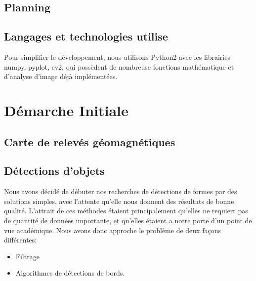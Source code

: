 \documentclass[a4paper, 12pt, titlepage, oneside, french]{article}
\begin{document}
	\subsection{Planning}
	\subsection{Langages et technologies utilise}
	Pour simplifier le développement, nous utilisons Python2 avec les librairies numpy, pyplot, cv2, qui possèdent de nombreuse fonctions mathématique et d'analyse d'image déjà implémentées.
	\newpage

\section{Démarche Initiale}
	\subsection{Carte de relevés géomagnétiques}
	\subsection{Détections d'objets}
	Nous avons décidé de débuter nos recherches de détections de formes par des solutions simples, avec l'attente qu'elle nous donnent des résultats de bonne qualité. L'attrait de ces méthodes étaient principalement qu'elles ne requiert pas de quantité de données importante, et qu'elles étaient a notre porte d'un point de vue académique. Nous avons donc approche le problème de deux façons différentes:
	\begin{itemize}
		\item Filtrage
		\item Algorithmes de détections de bords.
	\end{itemize}
\end{document}
